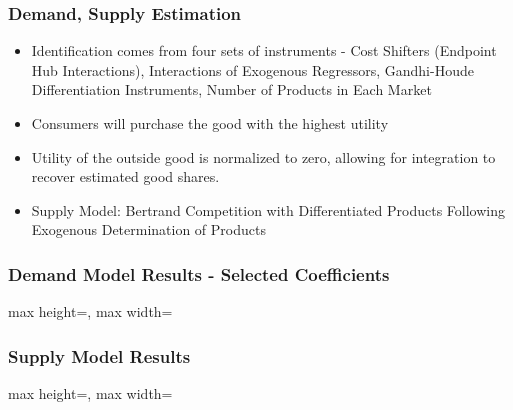 \documentclass[xcolor=dvipsnames]{beamer}
\begin{document}
    
    \begin{frame}
        \frametitle{Demand, Supply Estimation}
        \begin{itemize}
            \item Identification comes from four sets of instruments - Cost Shifters (Endpoint Hub Interactions), Interactions of Exogenous Regressors, Gandhi-Houde Differentiation Instruments, Number of Products in Each Market
            \item Consumers will purchase the good with the highest utility
            \item Utility of the outside good is normalized to zero, allowing for integration to recover estimated good shares.
            \item Supply Model: Bertrand Competition with Differentiated Products Following Exogenous Determination of Products
        \end{itemize}
    \end{frame}

    \begin{frame}
        \frametitle{Demand Model Results - Selected Coefficients}
        \tiny
        \centering
        \begin{adjustbox}{max height=\dimexpr\textheight-5.5cm\relax,
           max width=\textwidth}

\end{adjustbox}
    \end{frame}
    

    \begin{frame}
        \frametitle{Supply Model Results}
        \tiny
        \centering
        \begin{adjustbox}{max height=\dimexpr\textheight-5.5cm\relax,
           max width=\textwidth}

\end{adjustbox}
    \end{frame}
\end{document}
